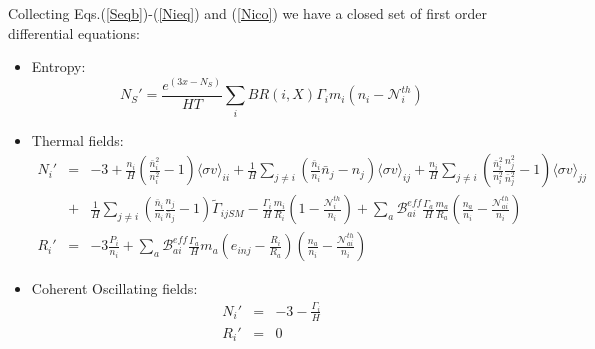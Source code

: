 \documentclass[preprint,notoc]{JHEP3}
\begin{document}
Collecting Eqs.(\ref{Seqb})-(\ref{Nieq}) and (\ref{Nico}) we have a closed set of first order differential equations:
\begin{itemize}
\item Entropy:
\begin{equation}
N_S' = \frac{e^{(3 x - N_S)}}{HT} \sum_{i} BR(i,X) \Gamma_i m_i \left(n_i -
\mathcal{N}_{i}^{th} \right) \label{eq:Sfin}
\end{equation}
\item Thermal fields:
\begin{eqnarray}
N_i'& = & -3
+ \frac{n_i}{H}\left( \frac{\bar{n}_i^2}{n_i^2} -1 \right) \langle \sigma v \rangle_{ii} 
+ \frac{1}{H} \sum_{j\neq i} \left( \frac{\bar{n}_i}{n_i} \bar{n}_j - n_j \right) \langle \sigma v \rangle_{ij}
+ \frac{n_i}{H} \sum_{j\neq i} \left(\frac{\bar{n}_i^2}{n_i^2}\frac{n_j^2}{\bar{n}_j^2}  - 1 \right) \langle \sigma v \rangle_{jj} \nonumber\\
&+& \frac{1}{H} \sum_{j\neq i} \left(\frac{\bar{n}_i}{n_i}\frac{n_j}{\bar{n}_j}  - 1\right)  \tilde{\Gamma}_{ijSM} 
 -  \frac{\Gamma_i}{H} \frac{m_i}{R_i}\left(1 - \frac{\mathcal{N}_{i}^{th}}{n_i} \right)
  +  \sum_{a} \mathcal{B}_{ai}^{eff} \frac{\Gamma_a}{H}
 \frac{m_a}{R_a}\left(\frac{n_a}{n_i} - \frac{\mathcal{N}_{ai}^{th}}{n_i}
  \right) \nonumber
 \\
R_i' & = &  -3 \frac{P_i}{n_i} + \sum_{a} \mathcal{B}_{ai}^{eff}
\frac{\Gamma_a}{H} m_a \left( e_{inj} - \frac{R_i}{R_a} \right) \left(\frac{n_a}{n_i} -
\frac{\mathcal{N}_{ai}^{th}}{n_i} \right)
\end{eqnarray}
\item Coherent Oscillating fields:
\begin{eqnarray}
N_i' & = & -3 - \frac{\Gamma_i}{H} \nonumber \\
R_i' & = & 0 \label{eq:COeq}
\end{eqnarray}
\end{itemize}
\end{document}
